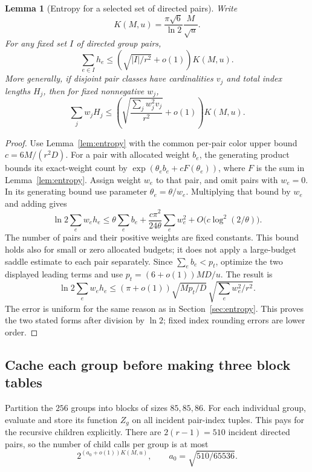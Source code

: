 \documentclass[11pt,letterpaper]{article}
\newtheorem{lemma}[theorem]{Lemma}
\theoremstyle{definition}\newtheorem{definition}[theorem]{Definition}
\theoremstyle{remark}\newtheorem{remark}[theorem]{Remark}
\begin{document}
\begin{lemma}[Entropy for a selected set of directed pairs]
\label{lem:subsetentropy}
Write
\[
 K(M,u)=\frac{\pi\sqrt6}{\ln2}\frac{M}{\sqrt u}.
\]
For any fixed set $I$ of directed group pairs,
\begin{equation}\label{eq:subsetentropy}
 \sum_{e\in I}h_e\le
   \left(\sqrt{|I|/r^2}+o(1)\right)K(M,u).
\end{equation}
More generally, if disjoint pair classes have cardinalities $v_j$ and
total index lengths $H_j$, then for fixed nonnegative $w_j$,
\begin{equation}\label{eq:weightedentropy}
 \sum_jw_jH_j\le
 \left(\sqrt{\frac{\sum_j w_j^2v_j}{r^2}}+o(1)\right)K(M,u).
\end{equation}
\end{lemma}
\begin{proof}
Use Lemma~\ref{lem:entropy} with the common per-pair color upper bound
$c=6M/(r^2D)$. For a pair with allocated weight $b_e$, the generating
product bounds its exact-weight count by $\exp(\theta_e b_e+cF(\theta_e))$,
where $F$ is the sum in Lemma~\ref{lem:entropy}. Assign weight $w_e$ to that pair, and
omit pairs with $w_e=0$. In its generating bound use parameter
$\theta_e=\theta/w_e$. Multiplying that bound by $w_e$ and adding gives
\[
 \ln2\sum_e w_eh_e
 \le\theta\sum_e b_e
  +\frac{c\pi^2}{24\theta}\sum_e w_e^2
  +O\bigl(c\log^2(2/\theta)\bigr).
\]
The number of pairs and their positive weights are fixed constants.
This bound holds also for small or zero allocated budgets; it does not
apply a large-budget saddle estimate to each pair separately.
Since $\sum_e b_e<p_t$, optimize the two displayed leading terms and
use $p_t=(6+o(1))MD/u$. The result is
\[
 \ln2\sum_e w_eh_e
 \le(\pi+o(1))\sqrt{Mp_t/D}\,
                         \sqrt{\sum_e w_e^2/r^2}.
\]
The error is uniform for the same reason as in Section~\ref{sec:entropy}.
This proves the two stated forms after division by $\ln2$; fixed index
rounding errors are lower order.
\end{proof}

\subsection{Cache each group before making three block tables}

Partition the $256$ groups into blocks of sizes $85,85,86$.
For each individual group, evaluate and store its function $Z_g$ on all
incident pair-index tuples. This pays for the recursive children explicitly.
There are $2(r-1)=510$ incident directed pairs, so the number of child calls
per group is at most
\[
 2^{(a_0+o(1))K(M,u)},\qquad a_0=\sqrt{510/65536}.
\]
\end{document}
